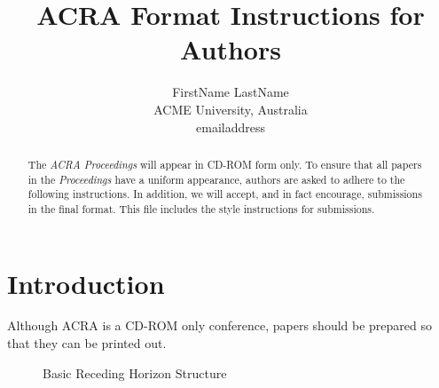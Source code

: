 \documentclass{article}
\title{ACRA Format Instructions for Authors}
\author{FirstName LastName \\ ACME University, Australia \\ 
emailaddress}
\begin{document}
\maketitle

\begin{abstract}
The {\it ACRA Proceedings} will appear in CD-ROM form only.
To ensure that all papers in the {\it Proceedings} have a
uniform appearance, authors are asked to adhere to the following
instructions. In addition, we will accept, and in fact encourage, 
submissions in the final format. This file includes the style instructions 
for submissions.
\end{abstract}

\section{Introduction}

Although ACRA is a CD-ROM only conference, papers should be prepared so that
they can be printed out. 

		\begin{figure}[!htbp]
			\begin{center}
			\end{center}
		\caption{Basic Receding Horizon Structure}
		\label{Figure:Results:RecedingHorizonMethodOutline}
		\end{figure}
		
\end{document}
